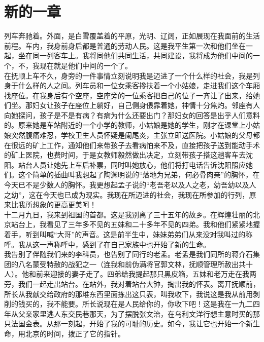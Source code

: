 \fancyhead[RO]{} %
\fancyhead[LE]{} %
\chapter*{新的一章}
\thispagestyle{empty}
列车奔驰着。外面，是白雪覆盖着的平原，光明、辽阔，正如展现在我面前的生活前程。车内，我身前身后都是普通的劳动人民。这是我平生第一次和他们坐在一起，坐在同一列客车上。我将同他们共同生活，共同建设，我将成为他们中间的一个，不，我现在就是他们中间的一个了。\\

在抚顺上车不久，身旁的一件事情立刻说明我是迈进了一个什么样的社会，我是列身于什么样的人之间。列车员和一位女乘客搀扶着一个小姑娘，走进我们这个车厢找座位。在我身后有个空座，空座旁的一位乘客把自己的位子一齐让了出来，给她们坐。那妇女让孩子在座位上躺好，自己侧身偎靠着她，神情十分焦灼。邻座有人向她探问，孩子是不是有病？有病为什么还要出门？那妇女的回答是出乎人们意料的。原来她是车站附近的一个小学的教师，小姑娘是她的学生，刚才在课堂上小姑娘突然腹痛难忍，学校卫生人员怀疑是阑尾炎，主张立即送医院。小姑娘的父母都在很远的矿上工作，通知他们来带孩子去看病怕来不及，直接把孩子送到能动手术的矿上医院，也费时间，于是女教师毅然做出决定，立刻带孩子搭这趟客车去沈阳。站台人员让她先上车后补票，同时叫她放心，他们将打电话告诉沈阳照应她们。这个简单的插曲叫我想起了陶渊明说的“落地为兄弟，何必骨肉亲”的胸怀，在今天已不是少数人的胸怀。我更想起孟子说的“老吾老以及人之老，幼吾幼以及人之幼”，这在今天也已成为现实。我现在所迈进的社会，我现在所参加的行列，原来比我所想象的更高更美呵！\\

十二月九日，我来到祖国的首都。这是我别离了三十五年的故乡。在辉煌壮丽的北京站台上，我看见了三年多不见的五妹和二十多年不见的四弟。我和他们紧紧地握着手，听到叫喊“大哥”的声音。这是前半生中，妹妹弟弟们从来没对我叫过的称呼。我从这一声称呼中，感到了在自己家族中也开始了新的生命。\\

我告别了伴随我们来的李科员，也告别了同行的老孟。老孟是我们同所的蒋介石集团的八名蒙受特赦的战犯之一（连我和前伪满将官郭文林，抚顺管理所赦出共十人）。他和前来迎接的妻子走了。四弟给我提起那只黑皮箱，五妹和老万走在我两旁，我们一起走出站台。在站外，我对着站台大钟，掏出我的怀表。离开抚顺前，所长从我献交给政府的那堆东西里面拣出这只表，叫我收下，我说这是我从前用剥削的钱买的，我不能要。所长说现在是人民给你的，你收下吧！这是我在一九二四年从父亲家里逃人东交民巷那天，为了摆脱张文治，在乌利文洋行想主意时买的那只法国金表。从那一刻起，开始了我的可耻的历史。如今，我让它也开始一个新生命，用北京的时间，拨正了它的指针。\\

